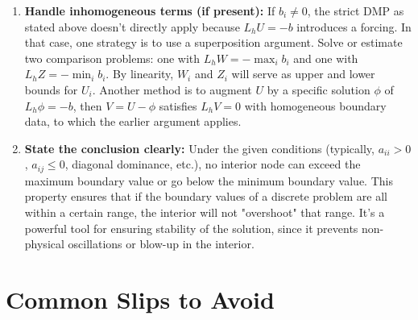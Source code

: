 \documentclass[a4paper,11pt]{report}
\begin{document}
\begin{enumerate}
    \item \textbf{Handle inhomogeneous terms (if present):} If $b_i \neq 0$, the strict DMP as stated above doesn't directly apply because $L_h U = -b$ introduces a forcing. In that case, one strategy is to use a superposition argument. Solve or estimate two comparison problems: one with $L_h W = -\max_i b_i$ and one with $L_h Z = -\min_i b_i$. By linearity, $W_i$ and $Z_i$ will serve as upper and lower bounds for $U_i$. Another method is to augment $U$ by a specific solution $\phi$ of $L_h \phi = -b$, then $V = U - \phi$ satisfies $L_h V = 0$ with homogeneous boundary data, to which the earlier argument applies.

    \item \textbf{State the conclusion clearly:} Under the given conditions (typically, $a_{ii}>0$, $a_{ij}\le0$, diagonal dominance, etc.), no interior node can exceed the maximum boundary value or go below the minimum boundary value. This property ensures that if the boundary values of a discrete problem are all within a certain range, the interior will not "overshoot" that range. It's a powerful tool for ensuring stability of the solution, since it prevents non-physical oscillations or blow-up in the interior.
\end{enumerate}

\section{Common Slips to Avoid}
\end{document}
